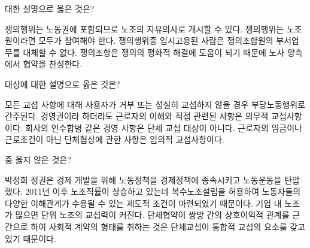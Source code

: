 \documentclass[11pt,answers]{exam} %
\begin{document}
\begin{questions}
 대한 설명으로 옳은 것은?
    \begin{choices}
    \choice\relax 쟁의행위는 노동권에 포함되므로 노조의 자유의사로 개시할 수 있다.
    \choice\relax 쟁의행위는 노조원이라면 모두가 참여해야 한다.
    \CorrectChoice\relax 쟁의행위중 임시고용된 사람은 쟁의조합원의 부서업무를 대체할 수 없다.
    \choice\relax 쟁의조항은 쟁의의 평화적 해결에 도움이 되기 때문에 노사 양측에서 협약을 찬성한다.
    \end{choices}


 대상에 대한 설명으로 옳은 것은?
    \begin{choices}
    \choice\relax 모든 교섭 사항에 대해 사용자가 거부 또는 성실히 교섭하지 않을 경우 부당노동행위로 간주된다.
    \CorrectChoice\relax 경영권이라 하더라도 근로자의 이해와 직접 관련된 사항은 의무적 교섭사항이다.
    \choice\relax 회사의 인수합병 같은 경영 사항은 단체 교섭 대상이 아니다.
    \choice\relax 근로자의 임금이나 근로조건이 아닌 단체협상에 관한 사항은 임의적 교섭사항이다.
    \end{choices}

 중 옳지 않은 것은?
    \begin{choices}
    \choice\relax 박정희 정권은 경제 개발을 위해 노동정책을 경제정책에 종속시키고 노동운동을 탄압했다.
    \choice\relax 2011년 이후 노조직률이 상승하고 있는데 복수노조설립을 허용하여 노동자들의 다양한 이해관계가 수용될 수 있는 제도적 조건이 마련되었기 때문이다.
    \CorrectChoice\relax 기업 내 노조가 많으면 단위 노조의 교섭력이 커진다.
    \choice\relax 단체협약이 쌍방 간의 상호이익적 관계를 근간으로 하여 사회적 계약의 형태를 취하는 것은 단체교섭이 통합적 교섭의 요소를 갖고 있기 때문이다.
    \end{choices}



\end{questions}
\end{document}
